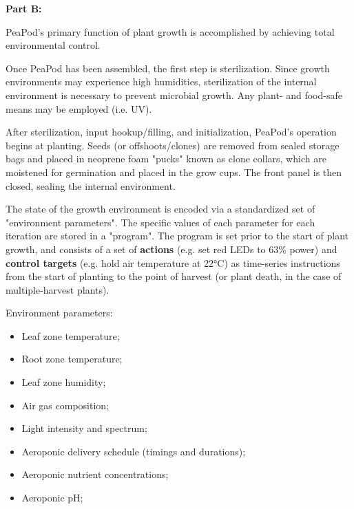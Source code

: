 \documentclass{report}
\begin{document}


\textbf{Part B:}
\label{sec:description-b}




PeaPod's primary function of plant growth is accomplished by achieving total environmental control. 

Once PeaPod has been assembled, the first step is sterilization. Since growth environments may experience high humidities, sterilization of the internal environment is necessary to prevent microbial growth. Any plant- and food-safe means may be employed (i.e. UV).

After sterilization, input hookup/filling, and initialization, PeaPod's operation begins at planting. Seeds (or offshoots/clones) are removed from sealed storage bags and placed in neoprene foam "pucks" known as clone collars, which are moistened for germination and placed in the grow cups. The front panel is then closed, sealing the internal environment.

The state of the growth environment is encoded via a standardized set of "environment parameters". The specific values of each parameter for each iteration are stored in a "program". The program is set prior to the start of plant growth, and consists of a set of \textbf{actions} (e.g. set red LEDs to 63\% power) and \textbf{control targets} (e.g. hold air temperature at 22°C) as time-series instructions from the start of planting to the point of harvest (or plant death, in the case of multiple-harvest plants). 

Environment parameters:
\begin{itemize}
    \item Leaf zone temperature;
    \item Root zone temperature;
    \item Leaf zone humidity;
    \item Air gas composition;
    \item Light intensity and spectrum;
    \item Aeroponic delivery schedule (timings and durations);
    \item Aeroponic nutrient concentrations;
    \item Aeroponic pH;
\end{itemize}
\end{document}

